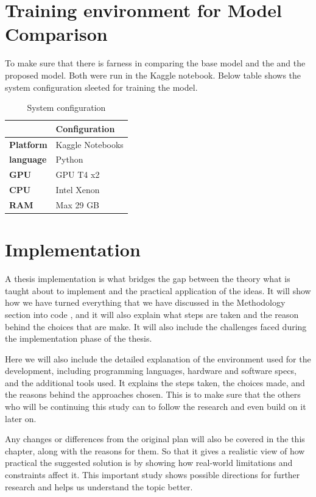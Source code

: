 \documentclass[12pt,onecolumn]{report}
\begin{document}
\section{Training environment for Model Comparison}

To make sure that there is farness in comparing the base model and the and the proposed model. Both were run in the Kaggle notebook. Below table shows the system configuration sleeted for training the model. 


\begin{table}[h!]
\centering
\begin{tabular}{|l|l|}
\hline
 & \textbf{Configuration} \\ \hline
\textbf{Platform}   & Kaggle Notebooks       \\ \hline
\textbf{language}   & Python       \\ \hline
\textbf{GPU}        & GPU T4 x2        \\ \hline
\textbf{CPU}        & Intel Xenon  \\ \hline
\textbf{RAM}        & Max 29 GB                  \\ \hline
\end{tabular}
\caption{System configuration}
\end{table}

\section{Implementation}
\label{sec:implementation}
A thesis implementation is what bridges the gap between the theory what is taught about to implement and the practical application of the ideas. It will show how we have turned everything that we have discussed in the Methodology section into code , and it will also explain what steps are taken and the reason behind the choices that are make. It will also include the challenges faced during the implementation phase of the thesis.

Here we will also include the detailed explanation of the environment used for the development, including programming languages, hardware and software specs, and the additional tools used. It explains the steps taken, the choices made, and the reasons behind the approaches chosen. This is to make sure that the others who will be continuing this study can to follow the research and even build on it later on.

Any changes or differences from the original plan will also be covered in the this chapter, along with the reasons for them. So that it gives a realistic view of how practical the suggested solution is by showing how real-world limitations and constraints affect it. This important study shows possible directions for further research and helps us understand the topic better.
\end{document}
